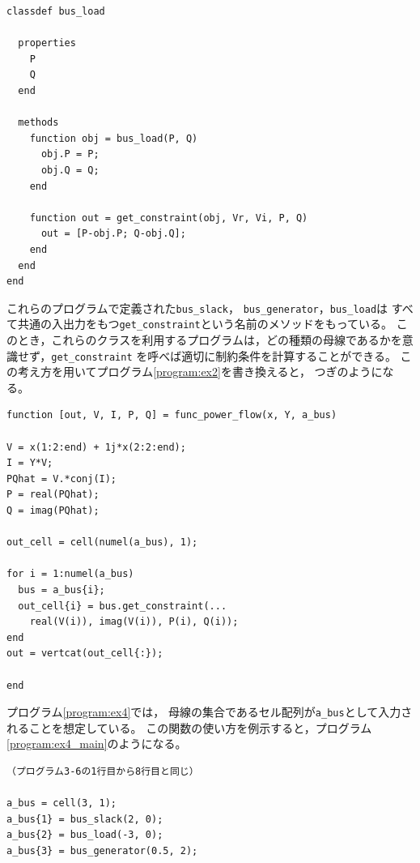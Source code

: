 \documentclass[tombow,dvipdfmx]{corona-a5-1.1}
\begin{document}
\begin{例}[多態性を用いた潮流計算の実装例]
\smallskip
\begin{PROGRAMA}[count,title={bus\_load.m}]\label{program:bus_PQ}
\begin{verbatim}
classdef bus_load
  
  properties
    P
    Q
  end
  
  methods
    function obj = bus_load(P, Q)
      obj.P = P;
      obj.Q = Q;
    end
    
    function out = get_constraint(obj, Vr, Vi, P, Q)
      out = [P-obj.P; Q-obj.Q];
    end
  end
end
\end{verbatim}
\end{PROGRAMA}

\smallskip

これらのプログラムで定義された\verb|bus_slack|，
\verb|bus_generator|，\verb|bus_load|は
すべて共通の入出力をもつ\verb|get_constraint|という名前のメソッドをもっている。
このとき，これらのクラスを利用するプログラムは，どの種類の母線であるかを意識せず，\verb|get_constraint|
を呼べば適切に制約条件を計算することができる。
この考え方を用いてプログラム\nobreak\ref{program:ex2}を書き換えると，
つぎのようになる。

\begin{PROGRAMA}[count, title={func\_power\_flow.m}]\label{program:ex4}%
\begin{verbatim}
function [out, V, I, P, Q] = func_power_flow(x, Y, a_bus)

V = x(1:2:end) + 1j*x(2:2:end);
I = Y*V;
PQhat = V.*conj(I);
P = real(PQhat);
Q = imag(PQhat);

out_cell = cell(numel(a_bus), 1);

for i = 1:numel(a_bus)
  bus = a_bus{i};
  out_cell{i} = bus.get_constraint(...
    real(V(i)), imag(V(i)), P(i), Q(i));
end
out = vertcat(out_cell{:});

end
\end{verbatim}
\end{PROGRAMA}

プログラム\nobreak\ref{program:ex4}では，
母線の集合であるセル配列が\verb|a_bus|として入力されることを想定している。
この関数の使い方を例示すると，プログラム\nobreak\ref{program:ex4_main}のようになる。

\smallskip
\begin{PROGRAMA}[count,title={main\_ex4.m}]\label{program:ex4_main}
\begin{verbatim}
（プログラム3-6の1行目から8行目と同じ）

a_bus = cell(3, 1);
a_bus{1} = bus_slack(2, 0);
a_bus{2} = bus_load(-3, 0);
a_bus{3} = bus_generator(0.5, 2);


\end{verbatim}
\end{PROGRAMA}
\end{例}
\end{document}
